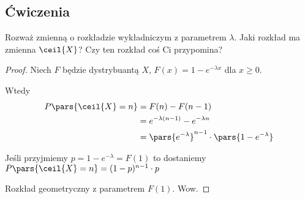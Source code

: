 \subsection{Ćwiczenia}

\begin{exercise}
    Rozważ zmienną o rozkładzie wykładniczym z parametrem \(\lambda\).
    Jaki rozkład ma zmienna \(\ceil{X}\)? Czy ten rozkład coś Ci przypomina?
\end{exercise}
\begin{proof}
    Niech \( F \) będzie dystrybuantą \( X \), \( F(x) = 1 - e^{-\lambda x} \) dla \( x \geq 0 \).
    
    Wtedy
    \begin{align*}
        P\pars{\ceil{X} = n} 
            &= F(n) - F(n - 1) \\
            &= e^{-\lambda(n-1)} - e^{-\lambda n} \\
            &= \pars{e^{-\lambda}}^{n-1} \cdot \pars{1 - e^{-\lambda}}
    \end{align*}
    
    Jeśli przyjmiemy \( p = 1 - e^{-\lambda} = F(1) \) to dostaniemy \( P\pars{\ceil{X} = n} = (1-p)^{n-1} \cdot p \)
    
    Rozkład geometryczny z parametrem \(F(1)\). Wow.
    
\end{proof}
